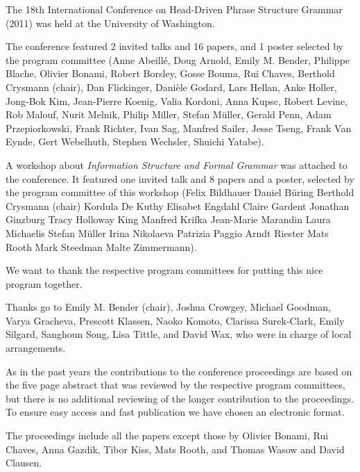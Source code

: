 The 18th International Conference on Head-Driven Phrase Structure Grammar (2011) was held at the University of Washington.

The conference featured 2 invited talks and 16 papers, and 1 poster selected by the program committee (Anne Abeillé,
Doug Arnold,
Emily M. Bender,
Philippe Blache,
Olivier Bonami,
Robert Borsley,
Gosse Bouma,
Rui Chaves,
Berthold Crysmann (chair),
Dan Flickinger,
Danièle Godard,
Lars Hellan,
Anke Holler,
Jong-Bok Kim,
Jean-Pierre Koenig,
Valia Kordoni,
Anna Kupsc,
Robert Levine,
Rob Malouf,
Nurit Melnik,
Philip Miller,
Stefan Müller,
Gerald Penn,
Adam Przepiorkowski,
Frank Richter,
Ivan Sag,
Manfred Sailer,
Jesse Tseng,
Frank Van Eynde,
Gert Webelhuth,
Stephen Wechsler,
Shuichi Yatabe).

A workshop about \emph{Information Structure and Formal Grammar}
was attached to the conference. It featured one invited talk and 8 papers and a poster, selected by the program
committee of this workshop (Felix Bildhauer
Daniel Büring
Berthold Crysmann (chair)
Kordula De Kuthy
Elisabet Engdahl
Claire Gardent
Jonathan Ginzburg
Tracy Holloway King
Manfred Krifka
Jean-Marie Marandin
Laura Michaelis
Stefan Müller
Irina Nikolaeva
Patrizia Paggio
Arndt Riester
Mats Rooth
Mark Steedman
Malte Zimmermann).

%
We want to thank the respective program committees for putting this nice program together.



Thanks go to Emily M. Bender (chair), Joshua Crowgey,
Michael Goodman,
Varya Gracheva,
Prescott Klassen,
Naoko Komoto,
Clarissa Surek-Clark,
Emily Silgard,
Sanghoun Song,
Lisa Tittle, and David Wax, who were in charge of local arrangements.


As in the past years the contributions to the conference proceedings are based on the five page abstract
that was reviewed by the respective program committees, but there is no additional reviewing of the
longer contribution to the proceedings.
To ensure easy access and fast publication we have chosen an electronic format.


The proceedings include all the papers except those by Olivier Bonami, Rui Chaves, Anna Gazdik,
Tibor Kiss, Mats Rooth, and Thomas Wasow and David Clausen.
